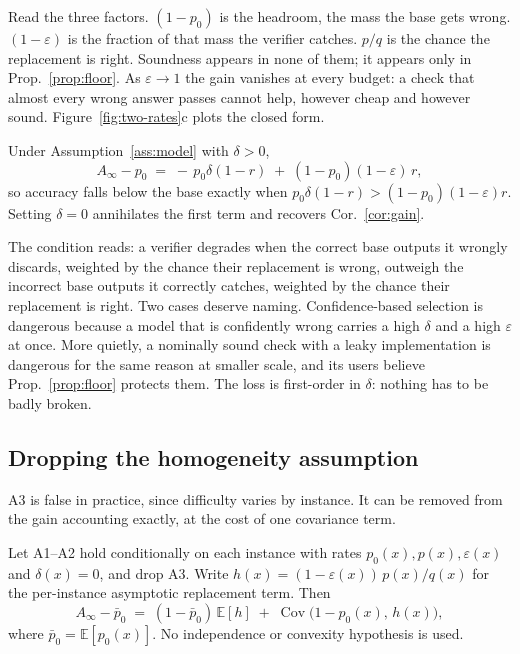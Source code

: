 \documentclass[11pt]{article}
\begin{document}
Read the three factors. $(1-p_0)$ is the headroom, the mass the base gets wrong. $(1-\varepsilon)$ is the fraction of that mass the verifier catches. $p/q$ is the chance the replacement is right. Soundness appears in none of them; it appears only in Prop.~\ref{prop:floor}. As $\varepsilon\to1$ the gain vanishes at every budget: a check that almost every wrong answer passes cannot help, however cheap and however sound. Figure~\ref{fig:two-rates}c plots the closed form.



\begin{corollary}[Degradation]\label{cor:degrade}
Under Assumption~\ref{ass:model} with $\delta>0$,
\[
A_\infty-p_0 \;=\; -\,p_0\delta(1-r)\;+\;(1-p_0)(1-\varepsilon)\,r ,
\]
so accuracy falls below the base exactly when $p_0\delta(1-r)>(1-p_0)(1-\varepsilon)r$. Setting $\delta=0$ annihilates the first term and recovers Cor.~\ref{cor:gain}.
\end{corollary}

The condition reads: a verifier degrades when the correct base outputs it wrongly discards, weighted by the chance their replacement is wrong, outweigh the incorrect base outputs it correctly catches, weighted by the chance their replacement is right. Two cases deserve naming. Confidence-based selection is dangerous because a model that is confidently wrong carries a high $\delta$ and a high $\varepsilon$ at once. More quietly, a nominally sound check with a leaky implementation is dangerous for the same reason at smaller scale, and its users believe Prop.~\ref{prop:floor} protects them. The loss is first-order in $\delta$: nothing has to be badly broken.

\subsection{Dropping the homogeneity assumption}\label{sec:hetero}
A3 is false in practice, since difficulty varies by instance. It can be removed from the gain accounting exactly, at the cost of one covariance term.

\begin{proposition}\label{prop:hetero}
Let A1--A2 hold conditionally on each instance with rates $p_0(x),p(x),\varepsilon(x)$ and $\delta(x)=0$, and drop A3. Write $h(x)=(1-\varepsilon(x))\,p(x)/q(x)$ for the per-instance asymptotic replacement term. Then
\[
A_\infty-\bar p_0 \;=\; (1-\bar p_0)\,\mathbb{E}[h] \;+\; \operatorname{Cov}\bigl(1-p_0(x),\,h(x)\bigr),
\]
where $\bar p_0=\mathbb{E}[p_0(x)]$. No independence or convexity hypothesis is used.
\end{proposition}
\end{document}
